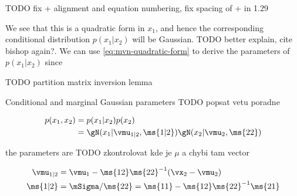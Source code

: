 {TODO fix + alignment and equation numbering, fix spacing of + in 1.29}

We see that this is a quadratic form in $x_1$, and hence the corresponding
conditional distribution $p(x_1 | x_2)$ will be Gaussian. {TODO better explain,
cite bishop again?}. We can use \eqref{eq:mvn-quadratic-form} to derive the
parameters of $p(x_1 | x_2)$ since

{TODO partition matrix inversion lemma}

\citep{murphy2012machine}

\begin{thm}
  Conditional and marginal Gaussian parameters \citep{murphy2012machine} {TODO popsat vetu poradne}

  \begin{align}
    p(x_1, x_2) &= p(x_1 | x_2) p(x_2) \\
                &= \gN(x_1 | \vmu_{1|2}, \ms{1|2}) \gN(x_2 | \vmu_2, \ms{22})
  \end{align}

  the parameters are {TODO zkontrolovat kde je $\mu$ a chybi tam vector}

  \begin{align}
    \vmu_{1|2} &= \vmu_1 - \ms{12} \ms{22}^{-1} (\vx_2 - \vmu_2) \\
    \ms{1|2} &= \mSigma / \ms{22} = \ms{11} - \ms{12} \ms{22}^{-1} \ms{21}
  \end{align}
\end{thm}

